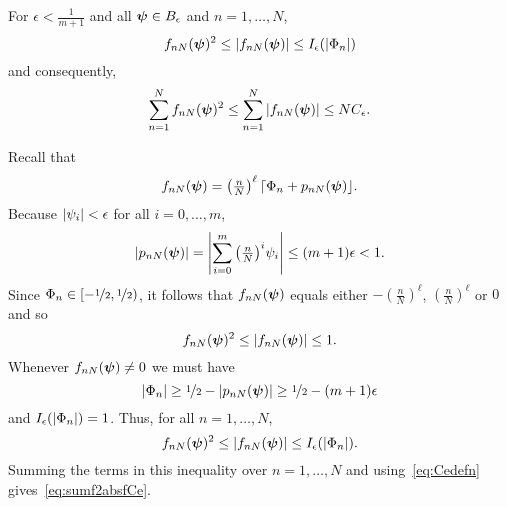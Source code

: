 \documentclass[journal]{IEEEtran}
\begin{document}
\begin{lemma}\label{lem:epslmlemma}
For $\epsilon < \frac{1}{m+1}$ and all $\boldsymbol{\psi} \in B_\epsilon$ and $n = 1, \dots, N$,
\[
f_{nN}(\boldsymbol{\psi})^2 \leq \left\vert f_{nN}(\boldsymbol{\psi}) \right\vert \leq I_\epsilon(\left\vert \Phi_n \right\vert)
\]
and consequently,
\begin{equation}\label{eq:sumf2absfCe}
\sum_{n=1}^{N}f_{nN}(\psibf)^2 \leq \sum_{n=1}^{N}\abs{f_{nN}(\psibf)} \leq N C_\epsilon.
\end{equation}
\end{lemma}
\begin{IEEEproof}
Recall that
\[
f_{nN}(\boldsymbol{\psi}) = \left( \tfrac{n}{N}\right)^\ell {\left\lceil \Phi_n + p_{nN}(\boldsymbol{\psi}) \right\rfloor}.
\]
Because $\left\vert \psi_i \right\vert < \epsilon$ for all $i = 0, \dots, m$, 
\begin{equation}\label{eq:pnNsmall}
\abs{p_{nN}(\psibf)} = \abs{\sum_{i=0}^{m}\big(\tfrac{n}{N}\big)^i \psi_i} \leq (m+1)\epsilon < 1.
\end{equation}
Since $\Phi_n \in [-\nicefrac{1}{2}, \nicefrac{1}{2})$, it follows that $f_{nN}(\boldsymbol{\psi})$ equals either $-(\tfrac{n}{N})^\ell$, $(\tfrac{n}{N})^\ell$ or $0$ and so
\begin{equation}\label{eq:fnNleqfnNs}
   f_{nN}(\psibf)^2 \leq \abs{f_{nN}(\psibf)} \leq 1.
\end{equation}
Whenever $f_{nN}(\boldsymbol{\psi}) \neq 0$ we must have 
\[
\left\vert \Phi_n \right\vert \geq \nicefrac{1}{2} - \left\vert p_{nN}(\boldsymbol{\psi}) \right\vert \geq \nicefrac{1}{2} - (m+1)\epsilon
\]
and $I_\epsilon(\left\vert \Phi_n \right\vert) = 1$.  Thus, for all $n = 1, \dots, N$,
\[
f_{nN}(\psibf)^2 \leq \abs{f_{nN}(\psibf)} \leq I_\epsilon(\abs{\Phi_n}). %
\]
Summing the terms in this inequality over $n = 1, \dots, N$ and using~\eqref{eq:Cedefn} gives~\eqref{eq:sumf2absfCe}.
\end{IEEEproof}
\end{document}
